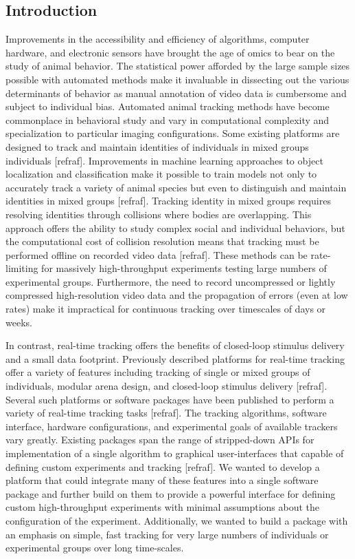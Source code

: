 \documentclass[10pt]{article}
\begin{document}
\begin{multicols}{2}


\section{Introduction}


Improvements in the accessibility and efficiency of algorithms, computer hardware, and electronic sensors have brought the age of omics to bear on the study of animal behavior. The statistical power afforded by the large sample sizes possible with automated methods make it invaluable in dissecting out the various determinants of behavior as manual annotation of video data is cumbersome and subject to individual bias. Automated animal tracking methods have become commonplace in behavioral study and vary in computational complexity and specialization to particular imaging configurations. Some existing platforms are designed to track and maintain identities of individuals in mixed groups individuals [refraf]. Improvements in machine learning approaches to object localization and classification make it possible to train models not only to accurately track a variety of animal species but even to distinguish and maintain identities in mixed groups [refraf]. Tracking identity in mixed groups requires resolving identities through collisions where bodies are overlapping. This approach offers the ability to study complex social and individual behaviors, but the computational cost of collision resolution means that tracking must be performed offline on recorded video data [refraf]. These methods can be rate-limiting for massively high-throughput experiments testing large numbers of experimental groups. Furthermore, the need to record uncompressed or lightly compressed high-resolution video data and the propagation of errors (even at low rates) make it impractical for continuous tracking over timescales of days or weeks.

In contrast, real-time tracking offers the benefits of closed-loop stimulus delivery and a small data footprint. Previously described platforms for real-time tracking offer a variety of features including tracking of single or mixed groups of individuals, modular arena design, and closed-loop stimulus delivery [refraf]. Several such platforms or software packages have been published to perform a variety of real-time tracking tasks [refraf]. The tracking algorithms, software interface, hardware configurations, and experimental goals of available trackers vary greatly. Existing packages span the range of stripped-down APIs for implementation of a single algorithm to graphical user-interfaces that capable of defining custom experiments and tracking [refraf]. We wanted to develop a platform that could integrate many of these features into a single software package and further build on them to provide a powerful interface for defining custom high-throughput experiments with minimal assumptions about the configuration of the experiment. Additionally, we wanted to build a package with an emphasis on simple, fast tracking for very large numbers of individuals or experimental groups over long time-scales. 


\end{multicols}
\end{document}
